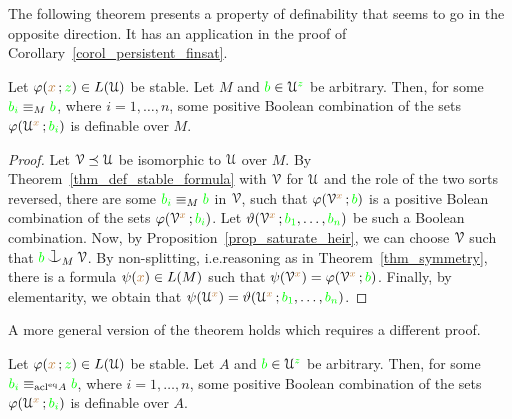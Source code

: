 
The following theorem presents a property of definability that seems to go in the opposite direction.
It has an application in the proof of Corollary~\ref{corol_persistent_finsat}.

\begin{theorem}\label{thm_stability_definable_rovescio1}
  Let $\varphi({\color{brown} x}\,;{\color{green} z})\in L(\EuScript U)$ be stable.
  Let $M$ and ${\color{green} b}\in\EuScript U^{\color{green} z}$ be arbitrary.
  Then, for some ${\color{green} b_i}\equiv_M{\color{green} b}$, where $i=1,\dots,n$, some positive Boolean combination of the sets $\varphi(\EuScript U^{\color{brown} x}\,;{\color{green} b_i})$ is definable over $M$.
\end{theorem}

\begin{proof}
  Let $\EuScript V\preceq\EuScript U$ be isomorphic to $\EuScript U$ over $M$.
  By Theorem~\ref{thm_def_stable_formula} with $\EuScript V$ for $\EuScript U$ and the role of the two sorts reversed, there are  some  ${\color{green} b_i}\equiv_M{\color{green} b}$ in $\EuScript V$, such that $\varphi(\EuScript V^{\color{brown} x}\,;{\color{green} b})$ is a positive Bolean combination of the sets $\varphi(\EuScript V^{\color{brown} x}\,;{\color{green} b_i})$.
  Let $\vartheta(\EuScript V^{\color{brown} x}\,;{\color{green} b_1},\dots,{\color{green} b_n})$ be such a Boolean combination.
  Now, by Proposition~\ref{prop_saturate_heir}, we can choose $\EuScript V$ such that ${\gr b}\cnonfork_M\V$.
  By non-splitting, i.e.\@ reasoning as in Theorem~\ref{thm_symmetry}, there is a formula $\psi({\color{brown} x})\in L(M)$ such that $\psi(\EuScript V^{\color{brown} x})=\varphi(\EuScript V^{\color{brown} x}\,;{\color{green} b})$.
  Finally, by elementarity, we obtain that $\psi(\EuScript U^{\color{brown} x})=\vartheta(\EuScript U^{\color{brown} x}\,;{\color{green} b_1},\dots,{\color{green} b_n})$.
\end{proof}

A more general version of the theorem holds which requires a different proof.

\begin{theorem}\label{thm_stability_definable_rovescio2}
  Let $\varphi({\color{brown} x}\,;{\color{green} z})\in L(\EuScript U)$ be stable.
  Let $A$ and ${\color{green} b}\in\EuScript U^{\color{green} z}$ be arbitrary.
  Then, for some ${\color{green} b_i}\equiv_{\mathop{\rm acl}^{{\rm eq}}\!A}{\color{green} b}$, where $i=1,\dots,n$, some positive Boolean combination of the sets $\varphi(\EuScript U^{\color{brown} x}\,;{\color{green} b_i})$ is definable over $A$.
\end{theorem}


